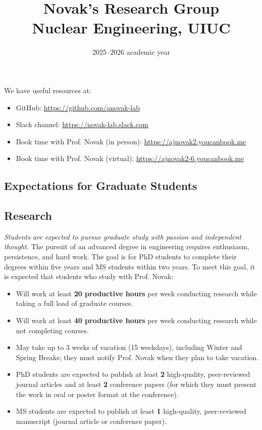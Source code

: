 \documentclass[12pt,twoside]{article}
\date{2025--2026 academic year}
\title{Novak's Research Group \\ Nuclear Engineering, UIUC}
\begin{document}
\maketitle

We have useful resources at:
\begin{itemize}
\item GitHub: \url{https://github.com/anovak-lab}
\item Slack channel: \url{https://novak-lab.slack.com}
\item Book time with Prof. Novak (in person): \url{https://ajnovak2.youcanbook.me}
\item Book time with Prof. Novak (virtual): \url{https://ajnovak2-6.youcanbook.me}
\end{itemize}

\begin{center}
\section*{Expectations for Graduate Students}
\end{center}

\subsection*{Research}

\textit{Students are expected to pursue graduate study with passion and independent thought.} The pursuit of an advanced degree in engineering requires enthusiasm, persistence, and hard work. The goal is for PhD students to complete their degrees within five years and MS students within two years. To meet this goal, it is expected that students who study with Prof. Novak:
%
\begin{itemize}
\item Will work at least \textbf{20 productive hours} per week conducting research while taking a full load of graduate courses.
\item Will work at least \textbf{40 productive hours} per week conducting research while not completing courses.
\item May take up to 3 weeks of vacation (15 weekdays), including Winter and Spring Breaks; they must notify Prof. Novak when they plan to take vacation.
\item PhD students are expected to publish at least \textbf{2} high-quality, peer-reviewed journal articles and at least \textbf{2} conference papers (for which they must present the work in oral or poster format at the conference).
\item MS students are expected to publish at least \textbf{1} high-quality, peer-reviewed manuscript (journal article or conference paper).
\end{itemize}
\end{document}
